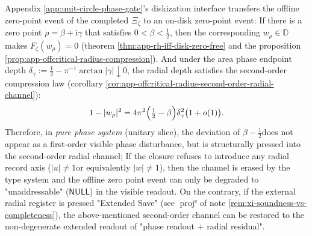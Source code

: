 \begin{corollary}\label{cor:xi-null-second-order-radial-channel}
Appendix \ref{app:unit-circle-phase-gate}’s diskization interface transfers the offline zero-point event of the completed \(\Xi_\zeta\) to an on-disk zero-point event: If there is a zero point \(\rho=\beta+\mathrm{i}\gamma\) that satisfies \(0<\beta<\tfrac12\), then the corresponding \(w_\rho\in\mathbb{D}\) makes \(F_\zeta(w_\rho)=0\) (theorem \ref{thm:app-rh-iff-disk-zero-free} and the proposition \ref{prop:app-offcritical-radius-compression}).
And under the area phase endpoint depth \(\delta_\gamma:=\tfrac12-\pi^{-1}\arctan|\gamma|\downarrow 0\), the radial depth satisfies the second-order compression law (corollary \ref{cor:app-offcritical-radius-second-order-radial-channel}):
\[
1-|w_\rho|^{2}=4\pi^{2}\Bigl(\tfrac12-\beta\Bigr)\delta_\gamma^{2}\bigl(1+o(1)\bigr).
\]
Therefore, in \emph{pure phase system} (unitary slice), the deviation of \(\beta-\tfrac12\) ​​does not appear as a first-order visible phase disturbance, but is structurally pressed into the second-order radial channel;
If the closure refuses to introduce any radial record axis (\(|u|\neq 1\) ​​or equivalently \(|w|\neq 1\)), then the channel is erased by the type system and the offline zero point event can only be degraded to "unaddressable" (\(\mathsf{NULL}\)) in the visible readout.
On the contrary, if the external radial register is pressed "Extended Save" (see \(\operatorname{proj}^{\mathrm e}\) ​​of note \ref{rem:xi-soundness-vs-completeness}), the above-mentioned second-order channel can be restored to the non-degenerate extended readout of "phase readout + radial residual".
\end{corollary}



